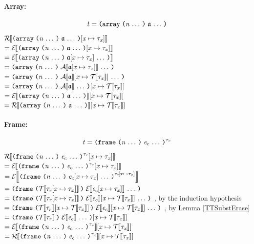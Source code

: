 \begin{sproof}
  \paragraph{Array:}
  \[\term = \arrlit{\sequence{\atom}}{\sequence{\nat}}\]
  $\EraseTrm{\typesubst{\arrlit{\sequence{\atom}}{\sequence{\nat}}}}$ \\
  $= \EraseE{\typesubst{\arrlit{\sequence{\atom}}{\sequence{\nat}}}}$ \\
  $= \EraseE{\arrlit{\sequence{\typesubst{\atom}}}{\sequence{\nat}}}$ \\
  $= \arrlit{\sequence{\EraseA{\typesubst{\atom}}}}{\sequence{\nat}}$ \\
  $= \arrlit{\sequence{\etypesubst{\EraseA{\atom}}}}{\sequence{\nat}}$ \\
  $= \etypesubst{\arrlit{\sequence{\EraseA{\atom}}}{\sequence{\nat}}}$ \\
  $= \etypesubst{\EraseE{\arrlit{\sequence{\atom}}{\sequence{\nat}}}}$ \\
  $= \etypesubst{\EraseTrm{\arrlit{\sequence{\atom}}{\sequence{\nat}}}}$ \\

  \paragraph{Frame:}
  \[\term = \notedfrm[\type_r]{\sequence{\expr_c}}{\sequence{\nat}}\]
  $\EraseTrm{\typesubst{\notedfrm[\type_r]{\sequence{\expr_c}}{\sequence{\nat}}}}$ \\
  $= \EraseE{\typesubst{\notedfrm[\type_r]{\sequence{\expr_c}}{\sequence{\nat}}}}$ \\
  $= \EraseE{\notedfrm[\typesubst{\type_r}]{\sequence{\typesubst{\expr_c}}}{\sequence{\nat}}}$ \\
  $= \frm{\sequence{\EraseE{\typesubst{\expr_c}}}}{\EraseT{\typesubst{\type_r}}}$ \\
  $= \frm{\sequence{\etypesubst{\EraseE{\expr_c}}}}{\EraseT{\typesubst{\type_r}}}$%
  , by the induction hypothesis \\
  $= \frm{\sequence{\etypesubst{\EraseE{\expr_c}}}}{\etypesubst{\EraseT{\type_r}}}$%
  , by Lemma \ref{TTSubstErase} \\
  $= \etypesubst{\frm{\sequence{\EraseE{\expr_c}}}{\EraseT{\type_r}}}$ \\
  $= \etypesubst{\EraseE{\notedfrm[\type_r]{\sequence{\expr_c}}{\sequence{\nat}}}}$ \\
  $= \etypesubst{\EraseTrm{\notedfrm[\type_r]{\sequence{\expr_c}}{\sequence{\nat}}}}$ \\


\end{sproof}
